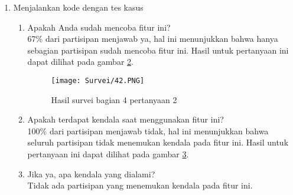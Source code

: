 \begin{enumerate}
\begin{enumerate}
\begin{figure}[H]
        	\caption{Hasil survei bagian 3 pertanyaan 4}
        	\label{fig:5:survei34} 
        \end{figure}
        \item Apakah fitur ini sudah cukup nyaman untuk digunakan? \\ Rata-rata skor untuk pertanyaan ini adalah 3.67, dapat disimpulkan bahwa fitur ini sudah cukup nyaman untuk digunakan. Hasil untuk pertanyaan ini dapat dilihat pada gambar \ref{fig:5:survei34}.
        \item Apakah ada pendapat/saran/masukan untuk fitur ini? \\ Berikut ini adalah masukan yang didapatkan:
        \begin{itemize}
            \item Tidak perlu ada keterangan Save, cukup Execute dan Submit saja
        \end{itemize}
    \end{enumerate}
    \item Menjalankan kode dengan tes kasus
    \begin{enumerate}
        \begin{figure}[H]
        	\centering  
        	\texttt{[image: Survei/41.PNG]}  
        	\caption{Hasil survei bagian 4 pertanyaan 1}
        	\label{fig:5:survei41} 
        \end{figure}
        \item Apakah Anda sudah mencoba fitur ini? \\ 67\% dari partisipan menjawab ya, hal ini menunjukkan bahwa hanya sebagian partisipan sudah mencoba fitur ini. Hasil untuk pertanyaan ini dapat dilihat pada gambar \ref{fig:5:survei41}.
        \begin{figure}[H]
        	\centering  
        	\texttt{[image: Survei/42.PNG]}  
        	\caption{Hasil survei bagian 4 pertanyaan 2}
        	\label{fig:5:survei42} 
        \end{figure}
        \item Apakah terdapat kendala saat menggunakan fitur ini? \\ 100\% dari partisipan menjawab tidak, hal ini menunjukkan bahwa seluruh partisipan tidak menemukan kendala pada fitur ini. Hasil untuk pertanyaan ini dapat dilihat pada gambar \ref{fig:5:survei42}.
        \item Jika ya, apa kendala yang dialami? \\ Tidak ada partisipan yang menemukan kendala pada fitur ini.
        \begin{figure}[H]

\end{figure}
\end{enumerate}
\end{enumerate}
